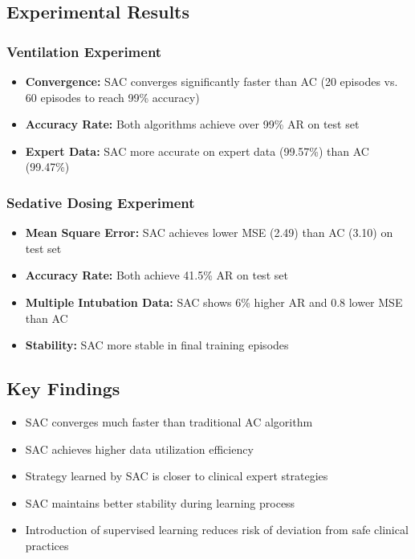\subsection*{Experimental Results}

\subsubsection*{Ventilation Experiment}
\begin{itemize}
    \item \textbf{Convergence:} SAC converges significantly faster than AC (20 episodes vs. 60 episodes to reach 99\% accuracy)
    \item \textbf{Accuracy Rate:} Both algorithms achieve over 99\% AR on test set
    \item \textbf{Expert Data:} SAC more accurate on expert data (99.57\%) than AC (99.47\%)
\end{itemize}

\subsubsection*{Sedative Dosing Experiment}
\begin{itemize}
    \item \textbf{Mean Square Error:} SAC achieves lower MSE (2.49) than AC (3.10) on test set
    \item \textbf{Accuracy Rate:} Both achieve 41.5\% AR on test set
    \item \textbf{Multiple Intubation Data:} SAC shows 6\% higher AR and 0.8 lower MSE than AC
    \item \textbf{Stability:} SAC more stable in final training episodes
\end{itemize}

\subsection*{Key Findings}
\begin{itemize}
    \item SAC converges much faster than traditional AC algorithm
    \item SAC achieves higher data utilization efficiency
    \item Strategy learned by SAC is closer to clinical expert strategies
    \item SAC maintains better stability during learning process
    \item Introduction of supervised learning reduces risk of deviation from safe clinical practices
\end{itemize}

